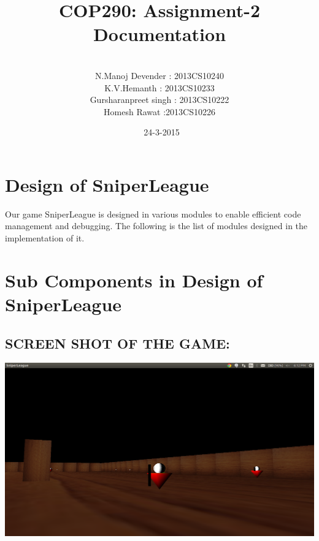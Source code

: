 \documentclass[10pt]{article}
\begin{document}
\title{COP290: Assignment-2 Documentation}
\author{\\ N.Manoj Devender : 2013CS10240\\K.V.Hemanth : 2013CS10233\\Gursharanpreet singh : 2013CS10222\\Homesh Rawat :2013CS10226
}
\date{\ 24-3-2015}
\maketitle

\hypersetup{
    colorlinks=true,
    linkcolor=blue,
    filecolor=magenta,      
    urlcolor=cyan,
}
\tableofcontents

\newpage 
\section{Design of SniperLeague}
     Our game SniperLeague is designed in various modules to enable efficient code management and debugging. The following is the list of modules designed in the implementation of it.

\section{Sub Components in Design of SniperLeague}

\subsection*{SCREEN SHOT OF THE GAME:}
\includegraphics[width=\textwidth]{screen_shot.png}
\\
\end{document}
